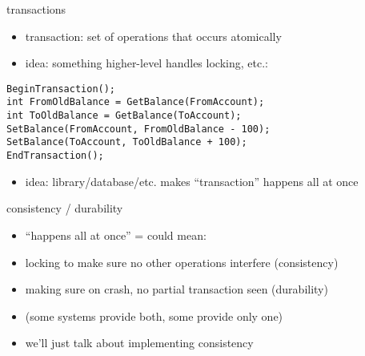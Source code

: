 \begin{frame}[fragile]{transactions}
    \begin{itemize}
    \item transaction: set of operations that occurs atomically
    \item idea: something higher-level handles locking, etc.:
   \end{itemize}
\begin{Verbatim}
BeginTransaction();
int FromOldBalance = GetBalance(FromAccount);
int ToOldBalance = GetBalance(ToAccount);
SetBalance(FromAccount, FromOldBalance - 100);
SetBalance(ToAccount, ToOldBalance + 100);
EndTransaction();
\end{Verbatim}
    \begin{itemize}
    \item idea: library/database/etc. makes ``transaction'' happens all at once
    \end{itemize}
\end{frame}

\begin{frame}{consistency / durability}
    \begin{itemize}
    \item ``happens all at once'' = could mean:
    \vspace{.5cm}
    \item locking to make sure no other operations interfere (consistency)
    \item making sure on crash, no partial transaction seen (durability)
    \vspace{.5cm}
    \item \small (some systems provide both, some provide only one)
    \item we'll just talk about implementing consistency
    \end{itemize}
\end{frame}
